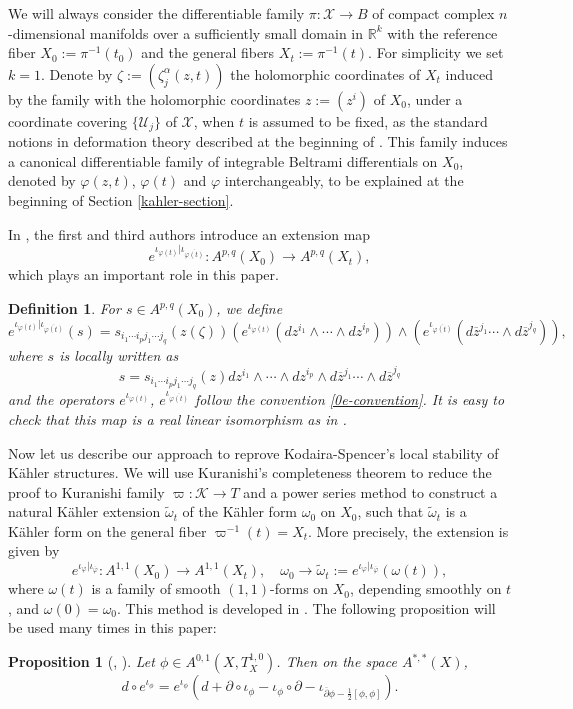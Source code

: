 \documentclass[12pt]{amsart}
\numberwithin{equation}{section}
\newtheorem{proposition}[theorem]{Proposition}
\newtheorem{definition}  [theorem]     {Definition}
\renewcommand{\1}{\mathds{1}}
\newcommand{\db}{\overline{\partial}}
\newcommand{\beq}{\begin{equation}}
\newcommand{\eeq}{\end{equation}}
\renewcommand{\>}{\rightarrow}
\newcommand{\p}{\partial}
\def\p{\partial}
\def\o{\overline}
\def\mc{\mathcal}
\begin{document}
We will always consider the differentiable family $\pi: \mathcal{X} \rightarrow
B$ of compact complex $n$-dimensional manifolds
over a sufficiently small domain in $\mathbb{R}^k$ with the
reference fiber $X_0:= \pi^{-1}(t_0)$ and the general fibers $X_t:=
\pi^{-1}(t).$ For simplicity we set $k=1$. Denote by
$\zeta:=(\zeta^\alpha_j(z,t))$ the holomorphic coordinates of $X_t$
induced by the family with the holomorphic coordinates $z:=(z^i)$ of
$X_0$, under a coordinate covering $\{\mathcal{U}_j\}$ of
$\mathcal{X}$, when $t$ is assumed to be fixed, as the standard
notions in deformation theory described at the beginning of
\cite[Chapter 4]{MK}. This family induces a canonical differentiable family of
integrable Beltrami differentials on $X_0$, denoted by $\varphi(z,t)$,
$\varphi(t)$ and $\varphi$ interchangeably, to be explained at the beginning of
Section \ref{kahler-section}.


In \cite{RZ15}, the first and third authors introduce an extension
map
$$e^{\iota_{\varphi(t)}|\iota_{\overline{\varphi(t)}}}:
 A^{p,q}(X_0)\> A^{p,q}(X_t),$$ which plays an important role in
 this paper.
\begin{definition}\label{map}\rm
For $s\in
 A^{p,q}(X_0)$, we define
$$\label{lbro} e^{\iota_{\varphi(t)}|\iota_{\overline{\varphi(t)}}}(s)=
s_{i_1\cdots i_pj_1\cdots
j_q}(z(\zeta))\left(e^{\iota_{\varphi(t)}}\left(dz^{i_1}\wedge\cdots\wedge
dz^{i_p}\right)\right)\wedge
\left(e^{\iota_{\overline{\varphi(t)}}}\left(d\overline{z}^{j_1}\cdots\wedge
d\overline{z}^{j_q}\right)\right),
$$
where $s$ is locally written as
$$s=s_{i_1\cdots i_pj_1\cdots
j_q}(z)dz^{i_1}\wedge\cdots\wedge dz^{i_p}\wedge
d\overline{z}^{j_1}\cdots\wedge d\overline{z}^{j_q}$$ and the
operators $e^{\iota_{\varphi(t)}}$,
$e^{\iota_{\overline{\varphi(t)}}}$ follow the convention
\eqref{0e-convention}. It is easy to check that this map is a real
linear isomorphism as in \cite[Lemma $2.8$]{RZ15}.
\end{definition}


Now let us describe our approach to reprove Kodaira-Spencer's
local stability of K\"{a}hler structures. We will use Kuranishi's completeness theorem \cite{ku} to reduce the proof to Kuranishi family $\varpi:\mc{K}\to T$ and a power series
method to construct a natural K\"{a}hler extension
$\tilde{\omega}_t$ of the K\"{a}hler form $\omega_0$ on $X_0$, such that $\tilde{\omega}_t$ is a
K\"{a}hler form on the general fiber $\varpi^{-1}(t)=X_t$. More
precisely, the extension is given by
$$e^{\iota_{\varphi}|\iota_{\o{\varphi}}}:A^{1,1}(X_0)\to A^{1,1}(X_t),\quad \omega_0\to \tilde{\omega}_t:=e^{\iota_{\varphi}|\iota_{\o{\varphi}}}(\omega(t)),$$
where $\omega(t)$ is a family of smooth $(1,1)$-forms on $X_0$,
depending smoothly on $t$, and $\omega(0)=\omega_0$. This method
is developed in
\cite{LSY,Sun,SY,lry,RZ,RZ2,RZ15}.
The following proposition will be used many times in this paper:
\begin{proposition}[{\cite[Theorem 3.4]{lry}, \cite[Proposition 2.2]{RZ15}}]\label{main1}
Let $\phi\in A^{0,1}(X,T^{1,0}_X)$. Then on the space $A^{*,*}(X)$,
\beq\label{ext-old} d\circ e^{\iota_\phi}=e^{\iota_\phi}(d+\p\circ
\iota_\phi-\iota_\phi\circ
\p-\iota_{\db\phi-\frac{1}{2}[\phi,\phi]}).\eeq
\end{proposition}
\end{document}
